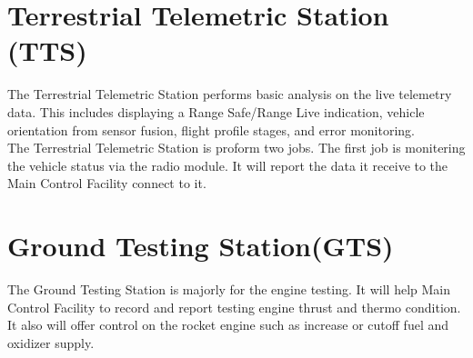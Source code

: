 \documentclass[12pt,article]{memoir}
\begin{document}
\chapter{Terrestrial Telemetric Station (TTS)}
The Terrestrial Telemetric Station performs basic analysis on the live telemetry data. This includes displaying a Range Safe/Range Live indication, vehicle orientation from sensor fusion, flight profile stages, and error monitoring.\\
The Terrestrial Telemetric Station is proform two jobs. The first job is monitering the vehicle status via the radio module. It will report the data it receive to the Main Control Facility connect to it. 
\newpage
\chapter{Ground Testing Station(GTS)}
The Ground Testing Station is majorly for the engine testing. It will help Main Control Facility to record and report testing engine thrust and thermo condition. It also will offer control on the rocket engine such as increase or cutoff fuel and oxidizer supply.
\end{document}
